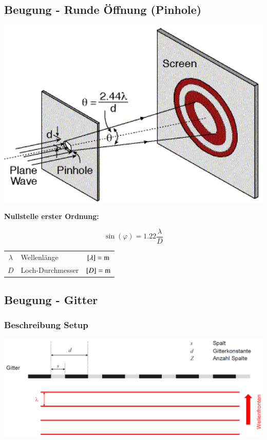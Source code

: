 

\subsection{Beugung - Runde Öffnung (Pinhole)}

\begin{minipage}{0.48\linewidth}
\includegraphics[width=0.98\linewidth]{Bilder/Wellen-Optik/beugung_loch} \\
\end{minipage}
\hfill
\begin{minipage}{0.48\linewidth}
\textbf{Nullstelle erster Ordnung:} 

$$ \boxed{ \sin(\varphi) = 1.22 \frac{\lambda}{D} } $$ 
\end{minipage}


\renewcommand{\arraystretch}{1.1}
\begin{tabular}{clc}
$\lambda$ & Wellenlänge & $[\lambda]= \mathrm{m}$ \\
$D$ & Loch-Durchmesser & $[D] = \mathrm{m}$
\end{tabular}
\renewcommand{\arraystretch}{1}



\subsection{Beugung - Gitter} %

\subsubsection{Beschreibung Setup}
\includegraphics[width=0.9\linewidth]{Bilder/Wellen-Optik/beugung_gitter} 


